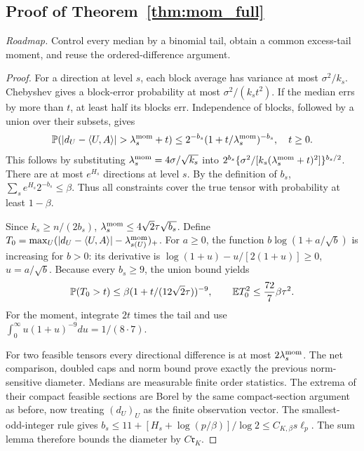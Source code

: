 \subsection{Proof of Theorem~\ref{thm:mom_full}}
\noindent\emph{Roadmap.} Control every median by a binomial tail, obtain a common excess-tail moment, and reuse the ordered-difference argument.
\begin{proof}
For a direction at level $s$, each block average has variance at most $\sigma^2/k_s$. Chebyshev gives a block-error probability at most $\sigma^2/(k_st^2)$. If the median errs by more than $t$, at least half its blocks err. Independence of blocks, followed by a union over their subsets, gives
\[
 \PP(|d_U-\ip UA|>\lambda_s^{\rm mom}+t)
 \le 2^{-b_s}(1+t/\lambda_s^{\rm mom})^{-b_s},\quad t\ge0.
\]
This follows by substituting $\lambda_s^{\rm mom}=4\sigma/\sqrt{k_s}$ into
$2^{b_s}\{\sigma^2/[k_s(\lambda_s^{\rm mom}+t)^2]\}^{b_s/2}$.
There are at most $e^{H_s}$ directions at level $s$. By the definition of $b_s$,
$\sum_s e^{H_s}2^{-b_s}\le\beta$.
Thus all constraints cover the true tensor with probability at least $1-\beta$.

Since $k_s\ge n/(2b_s)$,
$\lambda_s^{\rm mom}\le4\sqrt2\tau\sqrt{b_s}$.
Define
$T_0=\max_U(|d_U-\langle U,A\rangle|-\lambda_{s(U)}^{\rm mom})_+$.
For $a\ge0$, the function $b\log(1+a/\sqrt b)$ is increasing for $b>0$: its derivative is
$\log(1+u)-u/[2(1+u)]\ge0$, $u=a/\sqrt b$.
Because every $b_s\ge9$, the union bound yields
\begin{equation}\label{eq:mom_excess}
 \mathbb P(T_0>t)\le\beta(1+t/(12\sqrt2\tau))^{-9},\qquad
 \mathbb E T_0^2\le\frac{72}{7}\beta\tau^2.
\end{equation}
For the moment, integrate $2t$ times the tail and use
$\int_0^\infty u(1+u)^{-9}du=1/(8\cdot7)$.

For two feasible tensors every directional difference is at most $2\lambda_s^{\rm mom}$. The net comparison, doubled caps and norm bound prove exactly the previous norm-sensitive diameter. Medians are measurable finite order statistics. The extrema of their compact feasible sections are Borel by the same compact-section argument as before, now treating $(d_U)_U$ as the finite observation vector. The smallest-odd-integer rule gives
$b_s\le11+[H_s+\log(p/\beta)]/\log2\le C_{K,\beta}s\ell_p$.
The sum lemma therefore bounds the diameter by $C\mathfrak r_K$.


\end{proof}

